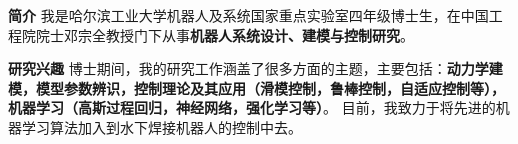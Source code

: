 %
%

\par{
{\textbf{简介}} 
我是哈尔滨工业大学机器人及系统国家重点实验室四年级博士生，在中国工程院院士邓宗全教授门下从事\textbf{机器人系统设计、建模与控制研究}。


{\textbf{研究兴趣}} 
博士期间，我的研究工作涵盖了很多方面的主题，主要包括：\textbf{动力学建模，模型参数辨识，控制理论及其应用（滑模控制，鲁棒控制，自适应控制等），机器学习（高斯过程回归，神经网络，强化学习等）}。
目前，我致力于将先进的机器学习算法加入到水下焊接机器人的控制中去。}

